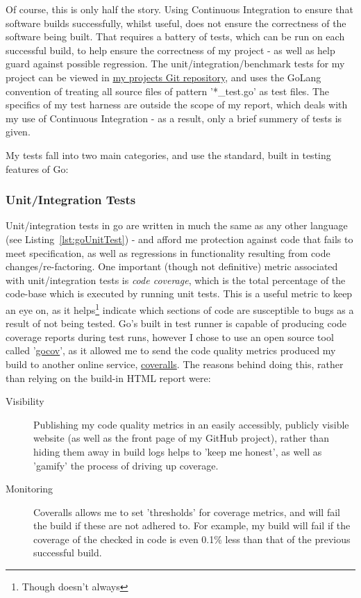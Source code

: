 Of course, this is only half the story. Using Continuous Integration to ensure
that software builds successfully, whilst useful, does not ensure the correctness
of the software being built. That requires a battery of tests, which can be run
on each successful build, to help ensure the correctness of my project - as well
as help guard against possible regression. The unit/integration/benchmark tests
for my project can be viewed in
\href{https://github.com/FireEater64/gamq}{my projects Git repository}, and uses
the GoLang convention of treating all source files of pattern '*\_test.go' as test
files. The specifics of my test harness are outside the scope of my report, which
deals with my use of Continuous Integration - as a result, only a brief summery of
tests is given.

My tests fall into two main categories, and use the standard, built in testing
features of Go:

\subsubsection{Unit/Integration Tests}
\label{subs:Unit/Integration Tests}

Unit/integration tests in go are written in much the same as any other language
(see Listing~\ref{lst:goUnitTest}) - and afford me protection against code that
fails to meet specification, as well as regressions in functionality resulting
from code changes/re-factoring. One important (though not definitive) metric
associated with unit/integration tests is \emph{code coverage}, which is the
total percentage of the code-base which is executed by running unit tests. This
is a useful metric to keep an eye on, as it helps\footnote{Though doesn't always}
indicate which sections of code are susceptible to bugs as a result of not being
tested. Go's built in test runner is capable of producing code coverage reports
during test runs, however I chose to use an open source tool called '\href{}{gocov}',
as it allowed me to send the code quality metrics produced my build to another
online service, \href{https://coveralls.io/}{coveralls}. The reasons behind doing
this, rather than relying on the build-in HTML report were:

\begin{description}
  \item[Visibility] Publishing my code quality metrics in an easily accessibly,
  publicly visible website (as well as the front page of my GitHub project),
  rather than hiding them away in build logs helps to
  'keep me honest', as well as 'gamify' the process of driving up coverage.
  \item[Monitoring] Coveralls allows me to set 'thresholds' for coverage metrics,
  and will fail the build if these are not adhered to. For example, my build will
  fail if the coverage of the checked in code is even 0.1\% less than that of the
  previous successful build.
\end{description}


